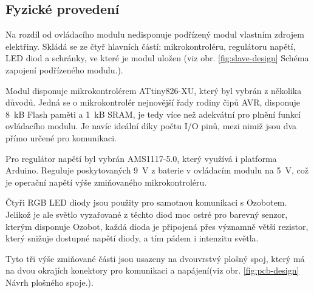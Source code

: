         \subsection{Fyzické provedení}
        Na rozdíl od ovládacího modulu nedisponuje podřízený modul vlastním zdrojem elektřiny. Skládá se ze čtyř hlavních částí: mikrokontroléru, regulátoru napětí, LED diod a schránky, ve které je modul uložen (viz obr. \ref{fig:slave-design} Schéma zapojení podřízeného modulu.).

        Modul disponuje mikrokontrolérem ATtiny826-XU, který byl vybrán z několika důvodů. Jedná se o mikrokontrolér nejnovější řady rodiny čipů AVR, disponuje \SI{8}{kB} Flash paměti a \SI{1}{kB} SRAM, je tedy více než adekvátní pro plnění funkcí ovládacího modulu. Je navíc ideální díky počtu I/O pinů, mezi nimiž jsou dva přímo určené pro komunikaci\cite{ATtiny826}.

        Pro regulátor napětí byl vybrán AMS1117-5.0, který využívá i platforma Arduino. Reguluje poskytovaných \SI{9}{V} z baterie v ovládacím modulu na \SI{5}{V}, což je operační napětí výše zmiňovaného mikrokontroléru.
        
        Čtyři RGB LED diody jsou použity pro samotnou komunikaci s Ozobotem. Jelikož je ale světlo vyzařované z těchto diod moc ostré pro barevný senzor, kterým disponuje Ozobot, každá dioda je připojená přes významně větší rezistor, který snižuje dostupné napětí diody, a tím pádem i intenzitu světla.

        Tyto tři výše zmiňované části jsou usazeny na dvouvrstvý plošný spoj, který má na dvou okrajích konektory pro komunikaci a napájení(viz obr. \ref{fig:pcb-design} Návrh plošného spoje.).

